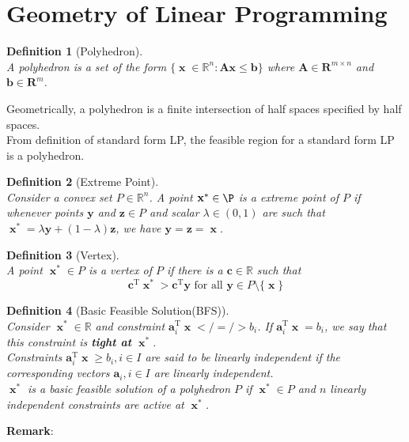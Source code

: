 \documentclass[12pt]{article}
\newcommand{\T}{\mathrm{T}}
\newcommand{\va}{\mathbf{a}}
\newtheorem{definition}{Definition}[section]
\theoremstyle{definition}
\DeclareMathOperator{\x}{\mathbf{x}}
\begin{document}
\section{Geometry of Linear Programming}
\begin{definition}[Polyhedron]
\hfill\\\normalfont A polyhedron is a set of the form $\{\x\in\mathbb{R}^n:\mathbf{Ax}\leq \mathbf{b}\}$ where $\mathbf{A}\in\mathbf{R}^{m\times n}$ and $\mathbf{b}\in\mathbf{R}^m$.
\end{definition}
Geometrically, a polyhedron is a finite intersection of half spaces specified by half spaces.\\
From definition of standard form LP, the feasible region for a standard form LP is a polyhedron.
\begin{definition}[Extreme Point]
\hfill\\\normalfont Consider a convex set $P\in\mathbb{R}^n$. A point $\x^\ast\in\P$ is a extreme point of $P$ if whenever points $\mathbf{y}$ and $\mathbf{z}\in P$ and scalar $\lambda\in(0,1)$ are such that $\x^\ast = \lambda\mathbf{y}+(1-\lambda)\mathbf{z}$, we have $\mathbf{y}=\mathbf{z}=\x$.\
\end{definition}
\begin{definition}[Vertex]
\hfill\\\normalfont A point $\x^\ast\in P$ is a vertex of $P$ if there is a $\mathbf{c}\in\mathbb{R}$ such that 
\[
\mathbf{c}^\T\x^\ast>\mathbf{c}^\T\mathbf{y}\text{ for all }\mathbf{y}\in P\setminus\{\x\}
\]
\end{definition}
\begin{definition}[Basic Feasible Solution(BFS)]
\hfill\\\normalfont Consider $\x^\ast \in\mathbb{R}$ and constraint $\va_i^\T\x </=/> b_i$. If $\va_i^\T\x=b_i$, we say that this constraint is \textbf{tight at} $\x^\ast$.\\
Constraints $\va_i^\T\x\geq b_i, i\in I$ are said to be linearly independent if the corresponding vectors $\va_i, i\in I$ are linearly independent.\\
$\x^\ast$ is a basic feasible solution of a polyhedron $P$ if $\x^\ast \in P$ and  $n$ linearly independent constraints are active at $\x^\ast$.
\end{definition}
\textbf{Remark}:
\end{document}
